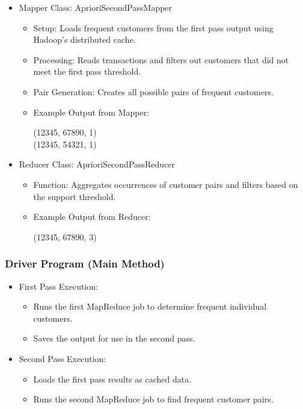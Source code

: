 \begin{itemize}
    \item Mapper Class: AprioriSecondPassMapper
    \begin{itemize}
        \item Setup: Loads frequent customers from the first pass output using Hadoop’s distributed cache.
        \item Processing: Reads transactions and filters out customers that did not meet the first pass threshold.
        \item Pair Generation: Creates all possible pairs of frequent customers.
        \item Example Output from Mapper:
        \begin{center}
        (12345, 67890, 1)\\
        (12345, 54321, 1)
        \end{center}
    \end{itemize}

    \item Reducer Class: AprioriSecondPassReducer
    \begin{itemize}
        \item Function: Aggregates occurrences of customer pairs and filters based on the support threshold.
        \item Example Output from Reducer:
        \begin{center}
        (12345, 67890, 3)
        \end{center}
    \end{itemize}
\end{itemize}

\subsubsection{Driver Program (Main Method)}

\begin{itemize}
    \item First Pass Execution:
    \begin{itemize}
        \item Runs the first MapReduce job to determine frequent individual customers.
        \item Saves the output for use in the second pass.
    \end{itemize}

    \item Second Pass Execution:
    \begin{itemize}
        \item Loads the first pass results as cached data.
        \item Runs the second MapReduce job to find frequent customer pairs.
    \end{itemize}
\end{itemize}